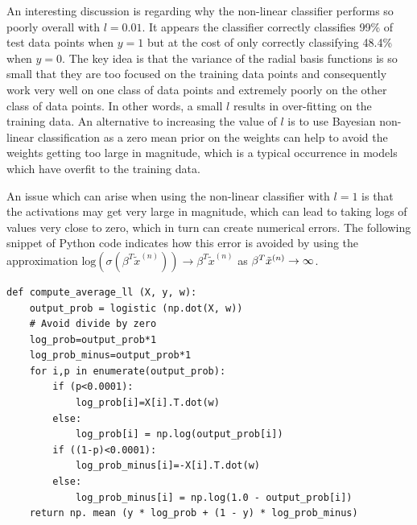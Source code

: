 \documentclass[twocolumn]{article}
\begin{document}
An interesting discussion is regarding why the non-linear classifier performs so poorly overall with $l=0.01$. It appears the classifier correctly classifies 99\% of test data points when $y=1$ but at the cost of only correctly classifying 48.4\% when $y=0$. The key idea is that the variance of the radial basis functions is so small that they are too focused on the training data points and consequently work very well on one class of data points and extremely poorly on the other class of data points. In other words, a small $l$ results in over-fitting on the training data. An alternative to increasing the value of $l$ is to use Bayesian non-linear classification as a zero mean prior on the weights can help to avoid the weights getting too large in magnitude, which is a typical occurrence in models which have overfit to the training data.

An issue which can arise when using the non-linear classifier with $l=1$ is that the activations may get very large in magnitude, which can lead to taking logs of values very close to zero, which in turn can create numerical errors. The following snippet of Python code indicates how this error is avoided by using the approximation $\text{log}(\sigma(\beta^T\tilde{x}^{(n)}))\rightarrow \beta^T\tilde{x}^{(n)}$ as $\beta^T\tilde{x}^{(n)}\rightarrow\-\infty$.

\begin{verbatim}
def compute_average_ll (X, y, w):
    output_prob = logistic (np.dot(X, w))
    # Avoid divide by zero
    log_prob=output_prob*1
    log_prob_minus=output_prob*1
    for i,p in enumerate(output_prob):
        if (p<0.0001):
            log_prob[i]=X[i].T.dot(w)
        else:
            log_prob[i] = np.log(output_prob[i])
        if ((1-p)<0.0001):
            log_prob_minus[i]=-X[i].T.dot(w)
        else:
            log_prob_minus[i] = np.log(1.0 - output_prob[i])
    return np. mean (y * log_prob + (1 - y) * log_prob_minus)
\end{verbatim}
\end{document}
